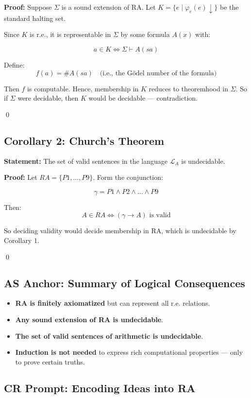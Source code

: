 \documentclass[12pt]{article}
\begin{document}
\textbf{Proof:} Suppose \( \Sigma \) is a sound extension of RA. Let \( K = \{ e \mid \varphi_e(e) \downarrow \} \) be the standard halting set.

Since \( K \) is r.e., it is representable in \( \Sigma \) by some formula \( A(x) \) with:

\[
a \in K \iff \Sigma \vdash A(sa)
\]

Define:
\[
f(a) = \#A(sa) \quad \text{(i.e., the Gödel number of the formula)}
\]

Then \( f \) is computable. Hence, membership in \( K \) reduces to theoremhood in \( \Sigma \). So if \( \Sigma \) were decidable, then \( K \) would be decidable — contradiction.

\qed

\subsection{Corollary 2: Church's Theorem}

\textbf{Statement:} The set of valid sentences in the language \( \mathcal{L}_A \) is undecidable.

\textbf{Proof:} Let \( RA = \{ P1, \dots, P9 \} \). Form the conjunction:

\[
\gamma = P1 \wedge P2 \wedge \dots \wedge P9
\]

Then:
\[
A \in RA \iff (\gamma \rightarrow A) \text{ is valid}
\]

So deciding validity would decide membership in RA, which is undecidable by Corollary 1.

\qed

\subsection*{AS Anchor: Summary of Logical Consequences}

\begin{itemize}
  \item \textbf{RA is finitely axiomatized} but can represent all r.e. relations.
  \item \textbf{Any sound extension of RA is undecidable}.
  \item \textbf{The set of valid sentences of arithmetic is undecidable}.
  \item \textbf{Induction is not needed} to express rich computational properties — only to prove certain truths.
\end{itemize}

\subsection*{CR Prompt: Encoding Ideas into RA}
\end{document}
